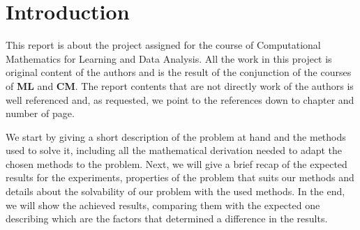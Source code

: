 \section{Introduction}
This report is about the project assigned for the course of Computational Mathematics for Learning and Data Analysis. All the work in this project is original content of the authors and is the result of the conjunction of the courses of \textbf{ML} and \textbf{CM}. The report contents that are not directly work of the authors is well referenced and, as requested, we point to the references down to chapter and number of page.\newline

We start by giving a short description of the problem at hand and the methods used to solve it, including all the mathematical derivation needed to adapt the chosen methods to the problem. Next, we will give a brief recap of the expected results for the experiments, properties of the problem that suits our methods and details about the solvability of our problem with the used methods. In the end, we will show the achieved results, comparing them with the expected one describing which are the factors that determined a difference in the results.